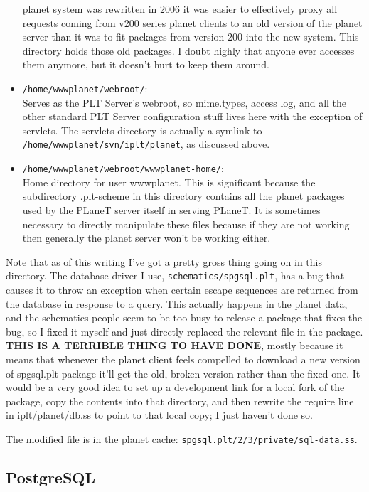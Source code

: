 \documentclass{article}
\begin{document}
\begin{itemize}
  planet system was rewritten in 2006 it was easier to effectively
  proxy all requests coming from v200 series planet clients to an old
  version of the planet server than it was to fit packages from
  version 200 into the new system. This directory holds those old
  packages. I doubt highly that anyone ever accesses them anymore, but
  it doesn't hurt to keep them around.
\item \texttt{/home/wwwplanet/webroot/}: \\
Serves as the PLT Server's webroot, so mime.types, access log, and all
  the other standard PLT Server configuration stuff lives here with
  the exception of servlets. The servlets directory is actually a
  symlink to \texttt{/home/wwwplanet/svn/iplt/planet}, as discussed above.
\item \texttt{/home/wwwplanet/webroot/wwwplanet-home/}: \\
Home directory for user wwwplanet. This is significant because the
  subdirectory .plt-scheme in this directory contains all the planet
  packages used by the PLaneT server itself in serving PLaneT. It is
  sometimes necessary to directly manipulate these files because if
  they are not working then generally the planet server won't be
  working either.
\end{itemize}

Note that as of this writing I've got a pretty gross thing going on in
this directory. The database driver I use, \texttt{schematics/spgsql.plt}, has
a bug that causes it to throw an exception when certain escape
sequences are returned from the database in response to a query. This
actually happens in the planet data, and the schematics people seem to
be too busy to release a package that fixes the bug, so I fixed it
myself and just directly replaced the relevant file in the
package. \textbf{THIS IS A TERRIBLE THING TO HAVE DONE}, mostly because it
means that whenever the planet client feels compelled to download a
new version of spgsql.plt package it'll get the old, broken version
rather than the fixed one. It would be a very good idea to set up a
development link for a local fork of the package, copy the contents
into that directory, and then rewrite the require line in
iplt/planet/db.ss to point to that local copy; I just haven't done
so.

The modified file is in the planet cache:
\texttt{spgsql.plt/2/3/private/sql-data.ss}.

\subsection{PostgreSQL}
\end{document}
